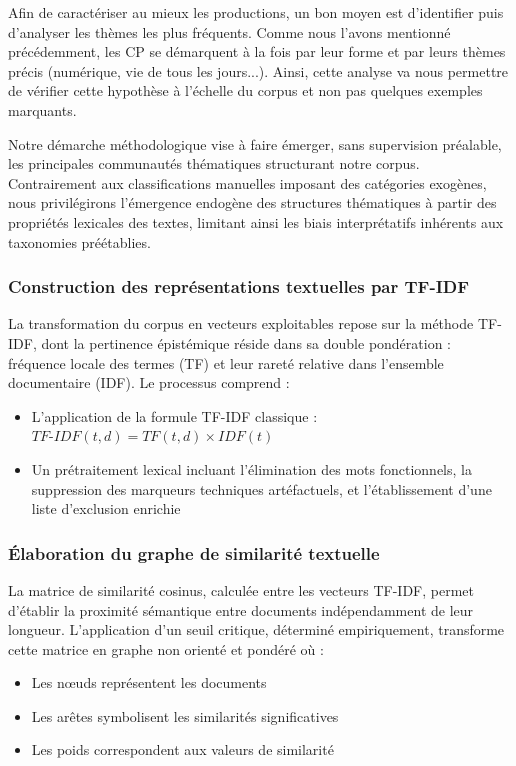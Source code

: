 \documentclass[12pt,a4paper,oneside,titlepage]{book} %
\begin{document}
Afin de caractériser au mieux les productions, un bon moyen est d'identifier puis d'analyser les thèmes les plus fréquents. Comme nous l'avons mentionné précédemment, les CP se démarquent à la fois par leur forme et par leurs thèmes précis (numérique, vie de tous les jours...). Ainsi, cette analyse va nous permettre de vérifier cette hypothèse à l'échelle du corpus et non pas quelques exemples marquants. 

Notre démarche méthodologique vise à faire émerger, sans supervision préalable, les principales communautés thématiques structurant notre corpus. Contrairement aux classifications manuelles imposant des catégories exogènes, nous privilégirons l'émergence endogène des structures thématiques à partir des propriétés lexicales des textes, limitant ainsi les biais interprétatifs inhérents aux taxonomies préétablies.

\subsubsection{Construction des représentations textuelles par TF-IDF}

La transformation du corpus en vecteurs exploitables repose sur la méthode TF-IDF, dont la pertinence épistémique réside dans sa double pondération : fréquence locale des termes (TF) et leur rareté relative dans l'ensemble documentaire (IDF). 
Le processus comprend :
\begin{itemize}
    \item L'application de la formule TF-IDF classique : $TF\text{-}IDF(t,d) = TF(t,d) \times IDF(t)$
    \item Un prétraitement lexical incluant l'élimination des mots fonctionnels, la suppression des marqueurs techniques artéfactuels, et l'établissement d'une liste d'exclusion enrichie
\end{itemize}

\subsubsection{Élaboration du graphe de similarité textuelle}

La matrice de similarité cosinus, calculée entre les vecteurs TF-IDF, permet d'établir la proximité sémantique entre documents indépendamment de leur longueur. L'application d'un seuil critique, déterminé empiriquement, transforme cette matrice en graphe non orienté et pondéré où :
\begin{itemize}
    \item Les nœuds représentent les documents
    \item Les arêtes symbolisent les similarités significatives
    \item Les poids correspondent aux valeurs de similarité
\end{itemize}
\end{document}
